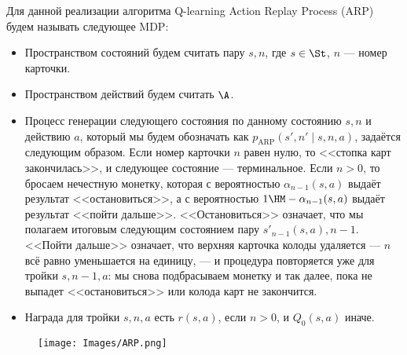 \newcommand{\ARP}{\mathrm{ARP}}
\begin{definition}
Для данной реализации алгоритма Q-learning Action Replay Process (ARP) будем называть следующее MDP:
\begin{itemize}
    \item Пространством состояний будем считать пару $s, n$, где $s \in \St$, $n$ --- номер карточки.
    \item Пространством действий будем считать $\A$.
    \item Процесс генерации следующего состояния по данному состоянию $s, n$ и действию $a$, который мы будем обозначать как $p_{\ARP}(s', n' \mid s, n, a)$, задаётся следующим образом. Если номер карточки $n$ равен нулю, то <<стопка карт закончилась>>, и следующее состояние --- терминальное. Если $n > 0$, то бросаем нечестную монетку, которая с вероятностью $\alpha_{n - 1}(s, a)$ выдаёт результат <<остановиться>>, а с вероятностью $1 \HM- \alpha_{n - 1}(s, a)$ выдаёт результат <<пойти дальше>>. <<Остановиться>> означает, что мы полагаем итоговым следующим состоянием пару $s'_{n - 1}(s, a), n - 1$. <<Пойти дальше>> означает, что верхняя карточка колоды удаляется --- $n$ всё равно уменьшается на единицу, --- и процедура повторяется уже для тройки $s, n - 1, a$: мы снова подбрасываем монетку и так далее, пока не выпадет <<остановиться>> или колода карт не закончится.
    \item Награда для тройки $s, n, a$ есть $r(s, a)$, если $n > 0$, и $Q_0(s, a)$ иначе.
\end{itemize}
\end{definition}

\begin{wrapfigure}{r}{0.35\textwidth}
\vspace{-0.3cm}
\centering
\texttt{[image: Images/ARP.png]}
\end{wrapfigure}


